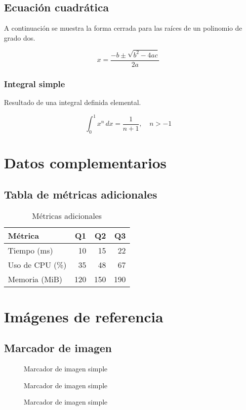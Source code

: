 \documentclass{report}
\begin{document}
\section{Ecuación cuadrática}
A continuación se muestra la forma cerrada para las raíces de un polinomio de grado dos.

\begin{equation}
  x = \frac{-b \pm \sqrt{b^{2} - 4ac}}{2a}
\end{equation}

\subsection{Integral simple}
Resultado de una integral definida elemental.

\begin{equation}
  \int_{0}^{1} x^{n}\,dx = \frac{1}{n+1}, \quad n > -1
\end{equation}

\chapter{Datos complementarios}
\section{Tabla de métricas adicionales}
\begin{table}[htbp]
  \centering
  \caption{Métricas adicionales}
  \begin{tabular}{@{}lrrr@{}}
    \toprule
    Métrica & Q1 & Q2 & Q3 \\
    \midrule
    Tiempo (ms) & 10 & 15 & 22 \\
    Uso de CPU (\%) & 35 & 48 & 67 \\
    Memoria (MiB) & 120 & 150 & 190 \\
    \bottomrule
  \end{tabular}
\end{table}

\chapter{Imágenes de referencia}
\section{Marcador de imagen}
\begin{figure}[htbp]
  \centering
  \setlength{\fboxsep}{0pt}\fbox{\rule{0pt}{40mm}\rule{80mm}{0pt}}
  \caption{Marcador de imagen simple}
\end{figure}
\begin{figure}[htbp]
  \centering
  \setlength{\fboxsep}{0pt}\fbox{\rule{0pt}{40mm}\rule{80mm}{0pt}}
  \caption{Marcador de imagen simple}
\end{figure}
\begin{figure}[htbp]
  \centering
  \setlength{\fboxsep}{0pt}\fbox{\rule{0pt}{40mm}\rule{80mm}{0pt}}
  \caption{Marcador de imagen simple}
\end{figure}
\end{document}
